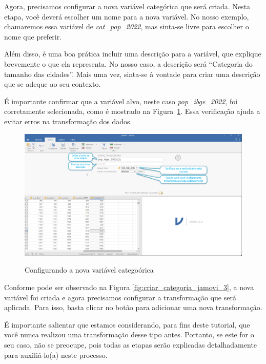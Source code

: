 Agora, precisamos configurar a nova variável categórica que será criada. Nesta etapa, você deverá escolher um nome para a nova variável. No nosso exemplo, chamaremos essa variável de \textit{cat\_pop\_2022}, mas sinta-se livre para escolher o nome que preferir. 

Além disso, é uma boa prática incluir uma descrição para a variável, que explique brevemente o que ela representa. No nosso caso, a descrição será ``Categoria do tamanho das cidades''. Mais uma vez, sinta-se à vontade para criar uma descrição que se adeque ao seu contexto.

É importante confirmar que a variável alvo, neste caso \textit{pop\_ibge\_2022}, foi corretamente selecionada, como é mostrado na Figura~\ref{fig:criar_categoria_jamovi_2}. Essa verificação ajuda a evitar erros na transformação dos dados.

\begin{figure}[H]
    \centering
    \caption{Configurando a nova variável categoórica}
    \includegraphics[width=\textwidth]{imagens/cap_2/criar_categoria_jamovi_2.png}
    \label{fig:criar_categoria_jamovi_2}
\end{figure}

Conforme pode ser observado na Figura \ref{fig:criar_categoria_jamovi_3}, a nova variável foi criada e agora precisamos configurar a transformação que será aplicada. Para isso, basta clicar no botão para adicionar uma nova transformação.

É importante salientar que estamos considerando, para fins deste tutorial, que você nunca realizou uma transformação desse tipo antes. Portanto, se este for o seu caso, não se preocupe, pois todas as etapas serão explicadas detalhadamente para auxiliá-lo(a) neste processo.

